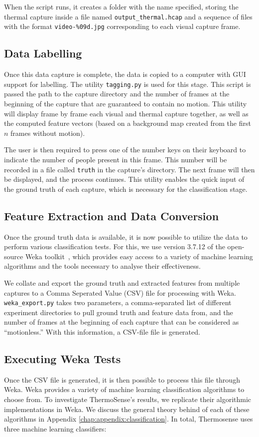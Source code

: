 \documentclass[../thesis/thesis.tex]{subfiles}
\begin{document}
When the script runs, it creates a folder with the name specified, storing the thermal capture inside a file named \texttt{output\_thermal.hcap} and a sequence of files with the format \texttt{video-\%09d.jpg} corresponding to each visual capture frame.

\subsection{Data Labelling}
\label{subsec:datalabelling}
Once this data capture is complete, the data is copied to a computer with GUI support for labelling. The utility \texttt{tagging.py} is used for this stage. This script is passed the path to the capture directory and the number of frames at the beginning of the capture that are guaranteed to contain no motion. This utility will display frame by frame each visual and thermal capture together, as well as the computed feature vectors (based on a background map created from the first $n$ frames without motion).

The user is then required to press one of the number keys on their keyboard to indicate the number of people present in this frame. This number will be recorded in a file called \texttt{truth} in the capture's directory. The next frame will then be displayed, and the process continues. This utility enables the quick input of the ground truth of each capture, which is necessary for the classification stage.

\subsection{Feature Extraction and Data Conversion}
Once the ground truth data is available, it is now possible to utilize the data to perform various classification tests. For this, we use version 3.7.12 of the open-source Weka toolkit~\cite{Weka}, which provides easy access to a variety of machine learning algorithms and the tools necessary to analyse their effectiveness.

We collate and export the ground truth and extracted features from multiple captures to a Comma Seperated Value (CSV) file for processing with Weka. \texttt{weka\_export.py} takes two parameters, a comma-separated list of different experiment directories to pull ground truth and feature data from, and the number of frames at the beginning of each capture that can be considered as ``motionless.'' With this information, a CSV-file file is generated.

\subsection{Executing Weka Tests}
Once the CSV file is generated, it is then possible to process this file through Weka. Weka provides a variety of machine learning classification algorithms to choose from. To investigate ThermoSense's results, we replicate their algorithmic implementations in Weka. We discuss the general theory behind of each of these algorithms in Appendix \ref{chap:appendix:classification}. In total, Thermosense uses three machine learning classifiers:
\end{document}
